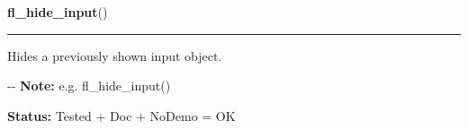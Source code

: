 \hspace{.8\funcindent}\begin{boxedminipage}{\funcwidth}

    \raggedright \textbf{fl\_hide\_input}()

    \vspace{-1.5ex}

    \rule{\textwidth}{0.5\fboxrule}
\setlength{\parskip}{2ex}

Hides a previously shown input object.

-{}-
\setlength{\parskip}{1ex}
\textbf{Note:} 
e.g. fl\_hide\_input()


\textbf{Status:} 
Tested + Doc + NoDemo = OK


    \end{boxedminipage}

    \label{xformslib:flgoodies:fl_show_simple_input}

    \vspace{0.5ex}

